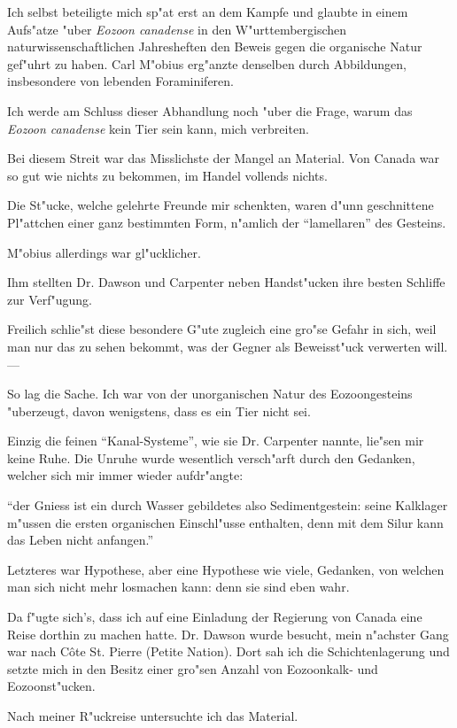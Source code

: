 \documentclass[a4paper, 11pt, oneside, german]{article}
\begin{document}
Ich selbst beteiligte mich sp"at erst an dem Kampfe und glaubte in einem Aufs"atze "uber \emph{Eozoon canadense} in den W"urttembergischen naturwissenschaftlichen Jahresheften den Beweis gegen die organische Natur gef"uhrt zu haben. Carl M"obius erg"anzte denselben durch Abbildungen, insbesondere von lebenden Foraminiferen.

Ich werde am Schluss dieser Abhandlung noch "uber die Frage, warum das \emph{Eozoon canadense} kein Tier sein kann, mich verbreiten.

Bei diesem Streit war das Misslichste der Mangel an Material. Von Canada war so gut wie nichts zu bekommen, im Handel vollends nichts.

Die St"ucke, welche gelehrte Freunde mir schenkten, waren d"unn geschnittene Pl"attchen einer ganz bestimmten Form, n"amlich der "`lamellaren"' des Gesteins.

M"obius allerdings war gl"ucklicher.

Ihm stellten Dr. Dawson und Carpenter neben Handst"ucken ihre besten Schliffe zur Verf"ugung.

Freilich schlie"st diese besondere G"ute zugleich eine gro"se Gefahr in sich, weil man nur das zu sehen bekommt, was der Gegner als Beweisst"uck verwerten will. ---

So lag die Sache. Ich war von der unorganischen Natur des Eozoongesteins "uberzeugt, davon wenigstens, dass es ein Tier nicht sei.

Einzig die feinen "`Kanal-Systeme"', wie sie Dr. Carpenter nannte, lie"sen mir keine Ruhe. Die Unruhe wurde wesentlich versch"arft durch den Gedanken, welcher sich mir immer wieder aufdr"angte:

"`der Gniess ist ein durch Wasser gebildetes also Sedimentgestein: seine Kalklager m"ussen die ersten organischen Einschl"usse enthalten, denn mit dem Silur kann das Leben nicht anfangen."'

Letzteres war Hypothese, aber eine Hypothese wie viele, Gedanken, von welchen man sich nicht mehr losmachen kann: denn sie sind eben wahr.

Da f"ugte sich's, dass ich auf eine Einladung der Regierung von Canada eine Reise dorthin zu machen hatte. Dr. Dawson wurde besucht, mein n"achster Gang war nach Côte St. Pierre (Petite Nation). Dort sah ich die Schichtenlagerung und setzte mich in den Besitz einer gro"sen Anzahl von Eozoonkalk- und Eozoonst"ucken.

Nach meiner R"uckreise untersuchte ich das Material.
\end{document}
